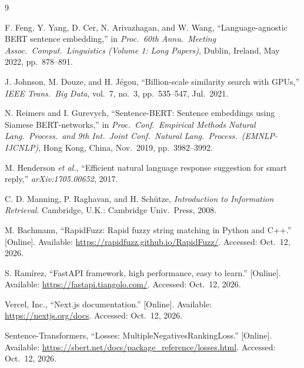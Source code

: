 \documentclass[12pt,a4paper]{article}
\begin{document}
\clearpage
{}
\begin{thebibliography}{9}

F. Feng, Y. Yang, D. Cer, N. Arivazhagan, and W. Wang, ``Language-agnostic BERT sentence embedding,'' in \textit{Proc.\ 60th Annu.\ Meeting Assoc.\ Comput.\ Linguistics (Volume 1: Long Papers)}, Dublin, Ireland, May 2022, pp.~878--891.

J. Johnson, M. Douze, and H. J\'egou, ``Billion-scale similarity search with GPUs,'' \textit{IEEE Trans.\ Big Data}, vol.~7, no.~3, pp.~535--547, Jul.\ 2021.

N. Reimers and I. Gurevych, ``Sentence-BERT: Sentence embeddings using Siamese BERT-networks,'' in \textit{Proc.\ Conf.\ Empirical Methods Natural Lang.\ Process.\ and 9th Int.\ Joint Conf.\ Natural Lang.\ Process.\ (EMNLP-IJCNLP)}, Hong Kong, China, Nov.\ 2019, pp.~3982--3992.

M. Henderson \textit{et al.}, ``Efficient natural language response suggestion for smart reply,'' \textit{arXiv:1705.00652}, 2017.

C. D. Manning, P. Raghavan, and H. Sch\"utze, \textit{Introduction to Information Retrieval}. Cambridge, U.K.: Cambridge Univ.\ Press, 2008.

M. Bachmann, ``RapidFuzz: Rapid fuzzy string matching in Python and C++.'' [Online]. Available: \url{https://rapidfuzz.github.io/RapidFuzz/}. Accessed: Oct.\ 12, 2026.

S. Ram\'irez, ``FastAPI framework, high performance, easy to learn.'' [Online]. Available: \url{https://fastapi.tiangolo.com/}. Accessed: Oct.\ 12, 2026.

Vercel, Inc., ``Next.js documentation.'' [Online]. Available: \url{https://nextjs.org/docs}. Accessed: Oct.\ 12, 2026.

Sentence-Transformers, ``Losses: MultipleNegativesRankingLoss.'' [Online]. Available: \url{https://sbert.net/docs/package_reference/losses.html}. Accessed: Oct.\ 12, 2026.

\end{thebibliography}
\end{document}
